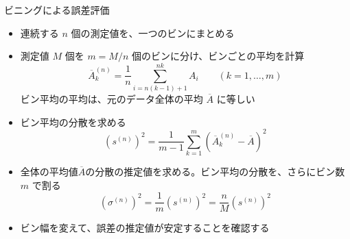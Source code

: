 
\begin{frame}[t,fragile]{ビニングによる誤差評価}
  \begin{itemize}
  \item 連続する \(n\) 個の測定値を、一つのビンにまとめる
  \item 測定値 \(M\) 個を \(m=M/n\) 個のビンに分け、ビンごとの平均を計算
    \[
    \overline A_k^{(n)}
    =\frac{1}{n}\sum_{i=n(k-1)+1}^{nk}A_i
    \qquad(k=1,\ldots,m)
    \]
    ビン平均の平均は、元のデータ全体の平均 \(\overline A\) に等しい

  \item ビン平均の分散を求める
    \[
    \left(s^{(n)}\right)^2
    =\frac{1}{m-1}\sum_{k=1}^{m}
    \left(\overline A_k^{(n)}-\overline A\right)^2
    \]

  \item 全体の平均値\(\overline{A}\)の分散の推定値を求める。ビン平均の分散を、さらにビン数 \(m\) で割る
    \[
    \boxed{
    \left(\sigma^{(n)}\right)^2
    =\frac{1}{m}\left(s^{(n)}\right)^2
    =\frac{n}{M}\left(s^{(n)}\right)^2
    }
    \]

  \item ビン幅を変えて、誤差の推定値が安定することを確認する
  \end{itemize}
\end{frame}
